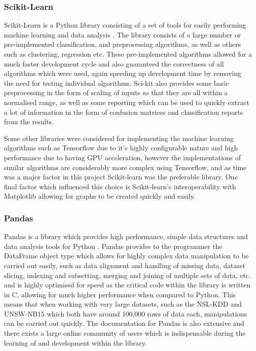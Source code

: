 \documentclass[12pt,a4paper]{article}
\begin{document}
\subsubsection{Scikit-Learn}
Scikit-Learn is a Python library consisting of a set of tools for easily performing machine learning and data analysis \parencite{scikit}. The library consists of a large number or pre-implemented classification, and preprocessing algorithms, as well as others such as clustering, regression etc. These pre-implemented algorithms allowed for a much faster development cycle and also guaranteed the correctness of all algorithms which were used, again speeding up development time by removing the need for testing individual algorithms. Sci-kit also provides some basic preprocessing in the form of scaling of inputs so that they are all within a normalised range, as well as some reporting which can be used to quickly extract a lot of information in the form of confusion matrices and classification reports from the results.
	
	Some other libraries were considered for implementing the machine learning algorithms such as Tensorflow due to it's highly configurable nature and high performance due to having GPU acceleration, however the implementations of similar algorithms are considerably more complex using Tensorflow, and as time was a major factor in this project Scikit-learn was the preferable library. One final factor which influenced this choice is Scikit-learn's interoperability with Matplotlib allowing for graphs to be created quickly and easily.

\subsubsection{Pandas}
Pandas is a library which provides high performance, simple data structures and data analysis tools for Python \parencite{pandas}. Pandas provides to the programmer the DataFrame object type which allows for highly complex data manipulation to be carried out easily, such as data alignment and handling of missing data, dataset slicing, indexing and subsetting, merging and joining of multiple sets of data, etc. and is highly optimised for speed as the critical code within the library is written in C, allowing for much higher performance when compared to Python. This means that when working with very large datasets, such as the NSL-KDD and UNSW-NB15 which both have around 100,000 rows of data each, manipulations can be carried out quickly. The documentation for Pandas is also extensive and there exists a large online community of users which is indispensable during the learning of and development within the library.
\end{document}
